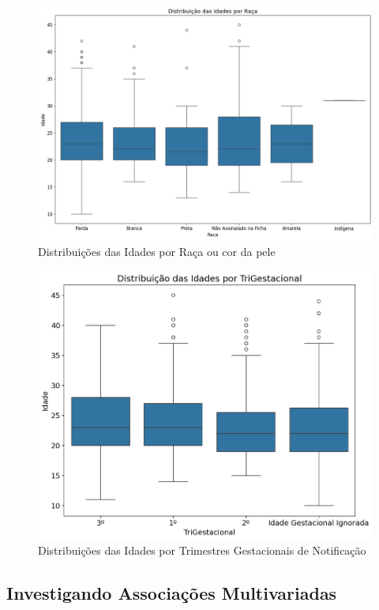 \documentclass[a4paper]{article}
\begin{document}
\begin{multicols}
\begin{figure}[h!]
    \centering
    \includegraphics[width=1\linewidth]{imagens/Raca_idade_boxplot.png}
    \caption{Distribuições das Idades por Raça ou cor da pele}
    \label{fig:enter-label}
\end{figure}

\begin{figure}
    \centering
    \includegraphics[width=1\linewidth]{imagens/TriGestacional_Idade_boxplot.png}
    \caption{Distribuições das Idades por Trimestres Gestacionais de Notificação}
    \label{fig:enter-label}
\end{figure}

\subsection{Investigando Associações Multivariadas}


\end{multicols}
\end{document}
